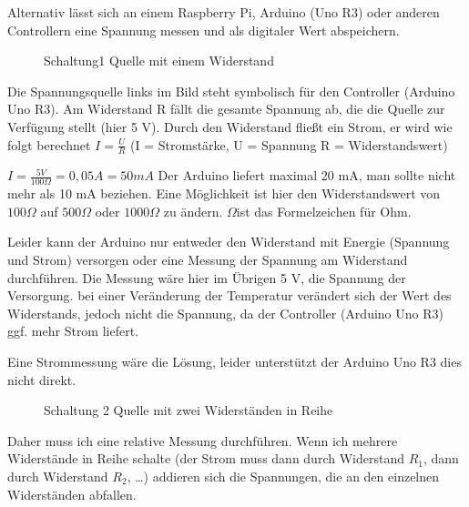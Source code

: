 \documentclass[paper = a4]{scrartcl}
\begin{document}
Alternativ lässt sich an einem Raspberry Pi, Arduino (Uno R3) oder anderen Controllern eine Spannung messen und als digitaler Wert abspeichern.

\begin{wrapfigure}{l}{0.5\textwidth}
 \centering
 
 \caption{Schaltung1 Quelle mit einem Widerstand}
 \label{abb:Schaltung1QuelleEinWiderstand}
\end{wrapfigure}

Die Spannungsquelle links im Bild steht symbolisch für den Controller (Arduino Uno R3). Am Widerstand R fällt die gesamte Spannung ab, die die Quelle zur Verfügung stellt (hier 5 V). Durch den Widerstand fließt ein Strom, er wird wie folgt berechnet $I = \frac{U}{R}$ (I = Stromstärke, U = Spannung R = Widerstandswert)

$I = \frac{5 V}{100 \Omega} = 0,05 A = 50 mA$ Der Arduino liefert maximal 20 mA, man sollte nicht mehr als 10 mA beziehen. Eine Möglichkeit ist hier den Widerstandswert von $100 \Omega$ auf $500 \Omega$ oder $1000 \Omega$ zu ändern. $\Omega$ist das Formelzeichen für Ohm.

Leider kann der Arduino nur entweder den Widerstand mit Energie (Spannung und Strom) versorgen oder eine Messung der Spannung am Widerstand durchführen. Die Messung wäre hier im Übrigen 5 V, die Spannung der Versorgung. bei einer Veränderung der Temperatur verändert sich der Wert des Widerstands, jedoch nicht die Spannung, da der Controller (Arduino Uno R3) ggf. mehr Strom liefert.

Eine Strommessung wäre die Lösung, leider unterstützt der Arduino Uno R3 dies nicht direkt.

\begin{wrapfigure}{l}{0.5\textwidth}
  \centering
  
  \caption{Schaltung 2 Quelle mit zwei Widerständen in Reihe}
  \label{abb:Schaltung2QuelleZweiWiderstaende}
\end{wrapfigure}

Daher muss ich eine relative Messung durchführen. Wenn ich mehrere Widerstände in Reihe schalte (der Strom muss dann durch Widerstand $R_1$, dann durch Widerstand $R_2$, \dots) addieren sich die Spannungen, die an den einzelnen Widerständen abfallen.
\end{document}

